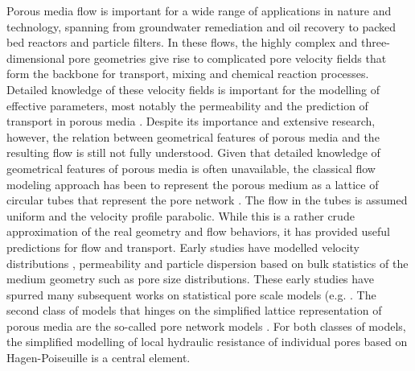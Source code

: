 \documentclass[draft]{agujournal2019}
\begin{document}
Porous media flow is important for a wide range of applications in nature and technology, spanning from groundwater remediation and oil recovery to packed bed reactors and particle filters. In these flows, the highly complex and three-dimensional pore geometries give rise to complicated pore velocity fields that form the backbone for transport, mixing and chemical reaction processes. Detailed knowledge of these velocity fields is important for the modelling of effective parameters, most notably the permeability and the prediction of transport in porous media \cite{bear_dynamics_1972,scheidegger_physics_1974}. Despite its importance and extensive research, however, the relation between geometrical features of porous media and the resulting flow is still not fully understood.
Given that detailed knowledge of geometrical features of porous media is often unavailable, the classical flow modeling approach has been to represent the porous medium as a lattice of circular tubes that represent the pore network \cite{scheidegger_physics_1974}. The flow in the tubes is assumed uniform and the velocity profile parabolic. While this is a rather crude approximation of the real geometry and flow behaviors, it has provided useful predictions for flow and transport. Early studies have modelled velocity distributions \cite{haring_statistical_1970}, permeability \cite{fatt_network_1956,katz_quantitative_1986} and particle dispersion \cite{saffman_theory_1959} based on bulk statistics of the medium geometry such as pore size distributions. These early studies have spurred many subsequent works on statistical pore scale models (e.g. \cite{dullien_single_1975,kutsovsky_nmr_1996,maier_simulation_1999,de_anna_prediction_2017,dentz_mechanisms_2018}. The second class of models that hinges on the simplified lattice representation of porous media are the so-called pore network models \cite{thompson_modeling_1997}. For both classes of models, the simplified modelling of local hydraulic resistance of individual pores based on Hagen-Poiseuille is a central element.
\end{document}

